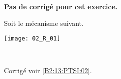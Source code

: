 \normaltrue
\correctionfalse


\setcounter{numques}{0}


\ifcorrection
\else
\textbf{Pas de corrigé pour cet exercice.}
\fi

\ifprof
\else
Soit le mécanisme suivant. 
\begin{center}
\texttt{[image: 02\_R\_01]}
\end{center}
\fi

\ifprof ~\\

\else
\fi


\ifprof
\else
\footnotesize

\normalsize

\begin{flushright}
\footnotesize{Corrigé  voir \ref{B2:13:PTSI:02}.}
\end{flushright}%
\fi